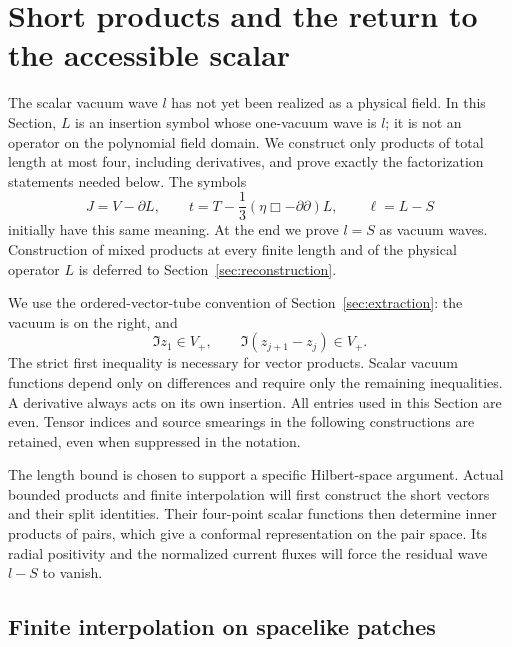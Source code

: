 \section{Short products and the return to the accessible scalar}
\label{sec:short-products}

The scalar vacuum wave $l$ has not yet been realized as a physical field.
In this Section, $L$ is an insertion symbol whose one-vacuum wave is $l$;
it is not an operator on the polynomial field domain.  We construct only
products of total length at most four, including derivatives, and prove
exactly the factorization statements needed below.  The symbols
\begin{equation}
 J=V-\partial L,\qquad
 t=T-\frac13(\eta\Box-\partial\partial)L,\qquad
 \ell=L-S
 \label{P:formal-fields}
\end{equation}
initially have this same meaning.  At the end we prove $l=S$ as vacuum
waves.  Construction of mixed products at every finite length and of the physical
operator $L$ is deferred to Section~\ref{sec:reconstruction}.

We use the ordered-vector-tube convention of
Section~\ref{sec:extraction}: the vacuum is on the right, and
\begin{equation}
 \Im z_1\in V_+,\qquad \Im(z_{j+1}-z_j)\in V_+.
 \label{P:vector-tube}
\end{equation}
The strict first inequality is necessary for vector products.  Scalar
vacuum functions depend only on differences and require only the remaining
inequalities.  A derivative always acts on its own insertion.  All entries used in this Section are even.  Tensor
indices and source smearings in the following constructions are retained,
even when suppressed in the notation.

The length bound is chosen to support a specific Hilbert-space
argument.  Actual bounded products and finite interpolation will
first construct the short vectors and their split identities.  Their
four-point scalar functions then determine inner products of pairs,
which give a conformal representation on the pair space.  Its radial
positivity and the normalized current fluxes will force the residual
wave $l-S$ to vanish.

\subsection{Finite interpolation on spacelike patches}

